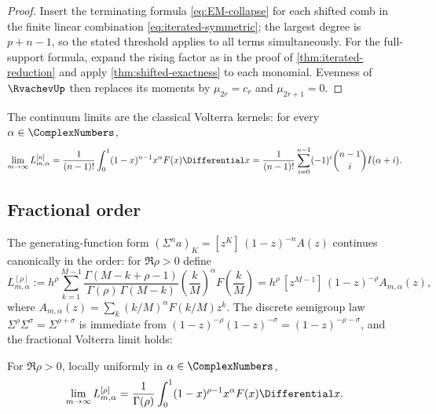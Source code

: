 \begin{proof}
Insert the terminating formula \eqref{eq:EM-collapse} for each shifted
comb in the finite linear combination \eqref{eq:iterated-symmetric};
the largest degree is $p+n-1$, so the stated threshold applies to all
terms simultaneously.  For the full-support formula, expand the rising
factor as in the proof of \cref{thm:iterated-reduction} and apply
\cref{thm:shifted-exactness} to each monomial.  Evenness of
$\RvachevUp$ then replaces its moments by $\mu_{2r}=c_r$ and
$\mu_{2r+1}=0$.
\end{proof}

The continuum limits are the classical Volterra kernels: for every
$\alpha\in\ComplexNumbers$,
\begin{equation}
 \lim_{m\to\infty}L^{[n]}_{m,\alpha}
 =\frac{1}{(n-1)!}\int_0^1(1-x)^{n-1}x^{\alpha}F(x)\Differential x
 =\frac{1}{(n-1)!}
 \sum_{i=0}^{n-1}(-1)^{i}\binom{n-1}{i}I(\alpha+i).
 \label{eq:iterated-limit}
\end{equation}

\subsection{Fractional order}

The generating-function form
$(\Sigma^{n}a)_{K}=[z^{K}]\,(1-z)^{-n}A(z)$ continues canonically in
the order: for $\Re\rho>0$ define
\begin{equation}
 L^{[\rho]}_{m,\alpha}
 :=h^{\rho}\sum_{k=1}^{M-1}
 \frac{\Gamma(M-k+\rho-1)}{\Gamma(\rho)\,\Gamma(M-k)}
 \left(\frac kM\right)^{\alpha}F\!\left(\frac kM\right)
 =h^{\rho}\,[z^{M-1}]\,(1-z)^{-\rho}A_{m,\alpha}(z),
 \label{eq:fractional-sum}
\end{equation}
where $A_{m,\alpha}(z)=\sum_k(k/M)^{\alpha}F(k/M)z^{k}$.  The discrete
semigroup law $\Sigma^{\rho}\Sigma^{\sigma}=\Sigma^{\rho+\sigma}$ is
immediate from $(1-z)^{-\rho}(1-z)^{-\sigma}=(1-z)^{-\rho-\sigma}$,
and the fractional Volterra limit holds:

\begin{theorem}
\label{thm:fractional-limit}
For $\Re\rho>0$, locally uniformly in $\alpha\in\ComplexNumbers$,
\begin{equation}
 \lim_{m\to\infty}L^{[\rho]}_{m,\alpha}
 =\frac{1}{\Gamma(\rho)}
 \int_0^1(1-x)^{\rho-1}x^{\alpha}F(x)\Differential x.
 \label{eq:fractional-limit}
\end{equation}
\end{theorem}


